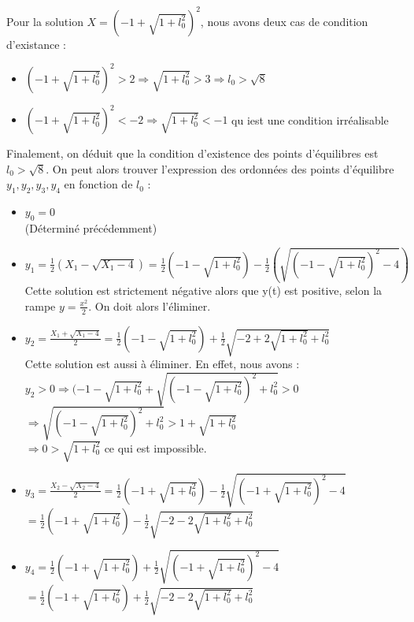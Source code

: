 \documentclass[10pt,a4paper]{article}
\begin{document}
Pour la solution $X=(-1+\sqrt{1+l_0^2})^2$, nous avons deux cas de condition d'existance :\\
\begin{itemize}
\item $(-1+\sqrt{1+l_0^2})^2 > 2 \Rightarrow \sqrt{1+l_0^2}>3\Rightarrow l_0 > \sqrt{8}$
\item $(-1+\sqrt{1+l_0^2})^2 < -2 \Rightarrow \sqrt{1+l_0^2}<-1$ qu iest une condition irréalisable
\end{itemize}
Finalement, on déduit que la condition d'existence des points d'équilibres est $l_0>\sqrt{8}$.
On peut alors trouver l'expression des ordonnées des points d'équilibre $y_1,y_2,y_3,y_4$ en fonction de $l_0$ :\\
\begin{itemize}
\item $y_0=0$\\
(Déterminé précédemment)\\
\item $y_1=\frac{1}{2}(X_1-\sqrt{X_1-4})=\frac{1}{2}(-1-\sqrt{1+l_0^2})-\frac{1}{2}(\sqrt{(-1-\sqrt{1+l_0^2})^2-4})$\\
Cette solution est strictement négative alors que y(t) est positive, selon la rampe $y=\frac{x^2}{2}$. On doit alors l'éliminer.\\
\item $y_2=\frac{X_1+\sqrt{X_1-4}}{2}=\frac{1}{2}(-1-\sqrt{1+l_0^2})+\frac{1}{2}\sqrt{-2+2\sqrt{1+l_0^2}+l_0^2}$\\
Cette solution est aussi à éliminer. En effet, nous avons : \\
$y_2 >0 \Rightarrow (-1-\sqrt{1+l_0^2}+\sqrt{(-1-\sqrt{1+l_0^2})^2+l_0^2} > 0$\\$\Rightarrow \sqrt{(-1-\sqrt{1+l_0^2})^2+l_0^2}>1+\sqrt{1+l_0^2}$\\$ \Rightarrow 0>\sqrt{1+l_0^2}$ ce qui est impossible.
\item $y_3=\frac{X_2-\sqrt{X_2-4}}{2}=\frac{1}{2}(-1+\sqrt{1+l_0^2})-\frac{1}{2}\sqrt{(-1+\sqrt{1+l_0^2})^2-4}$\\
$=\frac{1}{2}(-1+\sqrt{1+l_0^2})-\frac{1}{2}\sqrt{-2-2\sqrt{1+l_0^2}+l_0^2}$\\
\item $y_4=\frac{1}{2}(-1+\sqrt{1+l_0^2})+\frac{1}{2}\sqrt{(-1+\sqrt{1+l_0^2})^2-4}$\\
$=\frac{1}{2}(-1+\sqrt{1+l_0^2})+\frac{1}{2}\sqrt{-2-2\sqrt{1+l_0^2}+l_0^2}$\\
\end{itemize}
\end{document}
